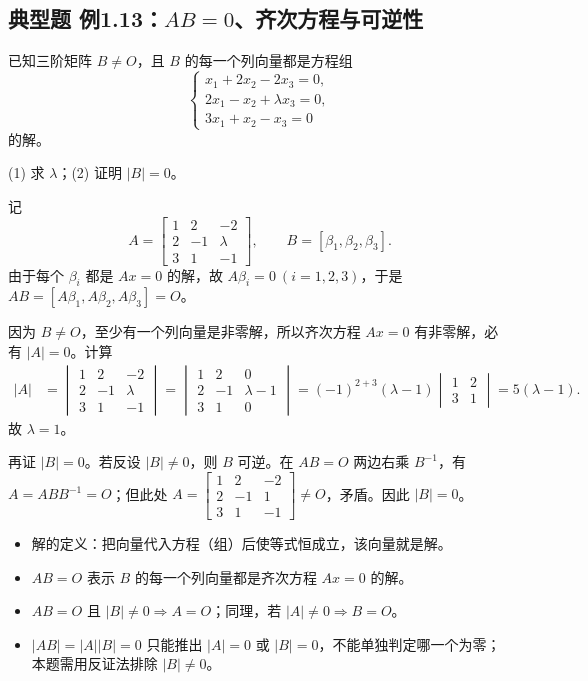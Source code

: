 \documentclass[UTF8,zihao=5,fontset=mac]{ctexart}
\newcommand{\mat}[1]{\begin{bmatrix}#1\end{bmatrix}}
\newcommand{\dmat}[1]{\begin{vmatrix}#1\end{vmatrix}}
\begin{document}
\subsection{典型题 例1.13：\texorpdfstring{$AB=0$}{AB=0}、齐次方程与可逆性}
\begin{problembox}[典型题]
已知三阶矩阵 $B\ne O$，且 $B$ 的每一个列向量都是方程组
\[
\begin{cases}
x_1+2x_2-2x_3=0,\\
2x_1-x_2+\lambda x_3=0,\\
3x_1+x_2-x_3=0
\end{cases}
\]
的解。

(1) 求 $\lambda$；\qquad (2) 证明 $|B|=0$。
\end{problembox}

记
\[
A=\mat{1&2&-2\\2&-1&\lambda\\3&1&-1},\qquad
B=[\beta_1,\beta_2,\beta_3].
\]
由于每个 $\beta_i$ 都是 $Ax=0$ 的解，故 $A\beta_i=0\ (i=1,2,3)$，于是 $AB=[A\beta_1,A\beta_2,A\beta_3]=O$。

因为 $B\ne O$，至少有一个列向量是非零解，所以齐次方程 $Ax=0$ 有非零解，必有 $|A|=0$。计算
\begin{align*}
|A|
&=\dmat{1&2&-2\\2&-1&\lambda\\3&1&-1}
=\dmat{1&2&0\\2&-1&\lambda-1\\3&1&0}
=(-1)^{2+3}(\lambda-1)\dmat{1&2\\3&1}
=5(\lambda-1).
\end{align*}
故 $\boxed{\lambda=1}$。

再证 $|B|=0$。若反设 $|B|\ne0$，则 $B$ 可逆。在 $AB=O$ 两边右乘 $B^{-1}$，有 $A=ABB^{-1}=O$；但此处 $A=\mat{1&2&-2\\2&-1&1\\3&1&-1}\ne O$，矛盾。因此 $\boxed{|B|=0}$。

\begin{summarybox}[补充与必背结论]
\begin{itemize}
  \item 解的定义：把向量代入方程（组）后使等式恒成立，该向量就是解。
  \item $AB=O$ 表示 $B$ 的每一个列向量都是齐次方程 $Ax=0$ 的解。
  \item $AB=O$ 且 $|B|\ne0\Rightarrow A=O$；同理，若 $|A|\ne0\Rightarrow B=O$。
  \item $|AB|=|A||B|=0$ 只能推出 $|A|=0$ 或 $|B|=0$，不能单独判定哪一个为零；本题需用反证法排除 $|B|\ne0$。
\end{itemize}
\end{summarybox}
\end{document}
